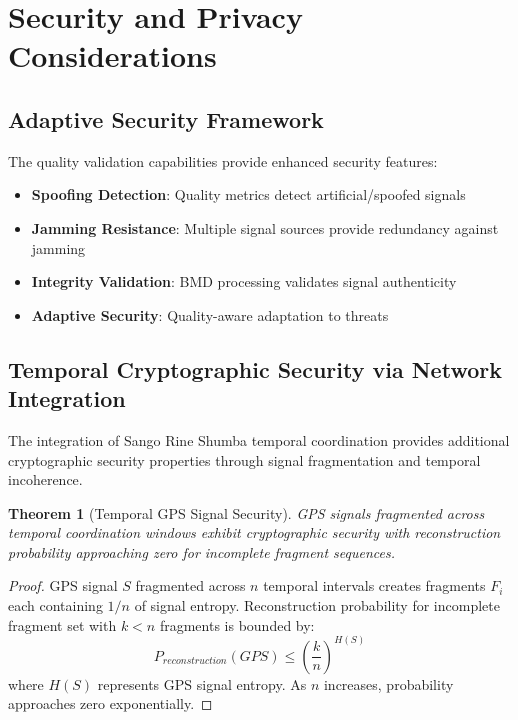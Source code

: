 \documentclass[12pt,a4paper]{article}
\newtheorem{theorem}{Theorem}[section]
\begin{document}
\section{Security and Privacy Considerations}

\subsection{Adaptive Security Framework}

The quality validation capabilities provide enhanced security features:

\begin{itemize}
\item \textbf{Spoofing Detection}: Quality metrics detect artificial/spoofed signals
\item \textbf{Jamming Resistance}: Multiple signal sources provide redundancy against jamming
\item \textbf{Integrity Validation}: BMD processing validates signal authenticity
\item \textbf{Adaptive Security}: Quality-aware adaptation to threats
\end{itemize}

\subsection{Temporal Cryptographic Security via Network Integration}

The integration of Sango Rine Shumba temporal coordination provides additional cryptographic security properties through signal fragmentation and temporal incoherence.

\begin{theorem}[Temporal GPS Signal Security]
GPS signals fragmented across temporal coordination windows exhibit cryptographic security with reconstruction probability approaching zero for incomplete fragment sequences.
\end{theorem}

\begin{proof}
GPS signal $S$ fragmented across $n$ temporal intervals creates fragments $F_i$ each containing $1/n$ of signal entropy. Reconstruction probability for incomplete fragment set with $k < n$ fragments is bounded by:
\begin{equation}
P_{reconstruction}(GPS) \leq \left(\frac{k}{n}\right)^{H(S)}
\end{equation}
where $H(S)$ represents GPS signal entropy. As $n$ increases, probability approaches zero exponentially.
\end{proof}
\end{document}

